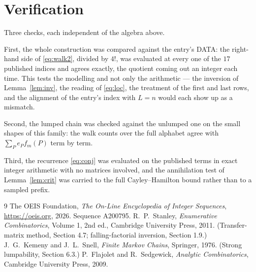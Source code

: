 \documentclass[11pt,a4paper]{article}
\theoremstyle{plain}
\theoremstyle{definition}
\begin{document}
\section{Verification}

Three checks, each independent of the algebra above.

First, the whole construction was compared against the entry's DATA: the right-hand side of
\eqref{eq:walk2}, divided by $4!$, was evaluated at every one of the $17$
published indices and agrees exactly, the quotient coming out an integer each time. This
tests the modelling and not only the arithmetic --- the inversion of Lemma~\ref{lem:inv},
the reading of \eqref{eq:loc}, the treatment of the first and last rows, and the
alignment of the entry's index with $L=n$ would each show up as a mismatch.

Second, the lumped chain was checked against the unlumped one on the small shapes of this
family: the walk counts over the full alphabet agree with $\sum_P e_Pf_m(P)$ term by term.

Third, the recurrence \eqref{eq:conj} was evaluated on the published terms in exact integer
arithmetic with no matrices involved, and the annihilation test of Lemma~\ref{lem:crit} was
carried to the full Cayley--Hamilton bound rather than to a sampled prefix.

\begin{thebibliography}{9}
 The OEIS Foundation, \emph{The On-Line Encyclopedia of Integer
Sequences}, \url{https://oeis.org}, 2026. Sequence A200795.
 R.~P.~Stanley, \emph{Enumerative Combinatorics}, Volume 1, 2nd ed.,
Cambridge University Press, 2011. (Transfer-matrix method, Section 4.7; falling-factorial
inversion, Section 1.9.)
 J.~G.~Kemeny and J.~L.~Snell, \emph{Finite Markov Chains}, Springer,
1976. (Strong lumpability, Section 6.3.)
 P.~Flajolet and R.~Sedgewick, \emph{Analytic Combinatorics}, Cambridge
University Press, 2009.
\end{thebibliography}
\end{document}
